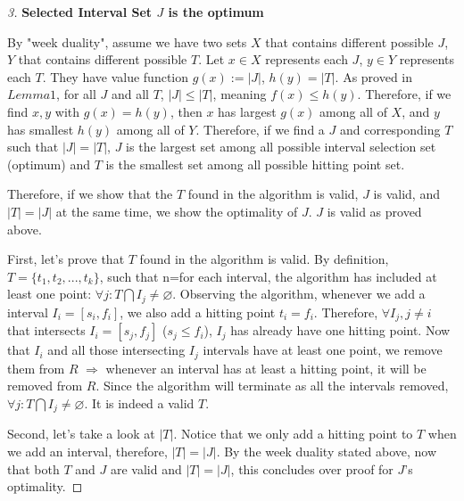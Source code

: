 \documentclass[openany]{article}
\begin{document}
\begin{proof}[3] \textbf{Selected Interval Set $J$ is the optimum}

    By "week duality", assume we have two sets $X$ that contains different possible $J$, $Y$ that contains different possible $T$. Let $x\in X$ represents each $J$, $y\in Y$ represents each $T$. They have value function $g(x):=|J|$, $h(y)=|T|$. As proved in $Lemma 1$, for all $J$ and all $T$, $|J| \leq |T|$, meaning $f(x) \leq h(y)$. Therefore, if we find $x, y$ with $g(x) = h(y)$, then $x$ has largest $g(x)$ among all of $X$, and $y$ has smallest $h(y)$ among all of $Y$. Therefore, if we find a $J$ and corresponding $T$ such that $|J| = |T|$, $J$ is the largest set among all possible interval selection set (optimum) and $T$ is the smallest set among all possible hitting point set.

    \qquad Therefore, if we show that the $T$ found in the algorithm is valid, $J$ is valid, and $|T|=|J|$ at the same time, we show the optimality of $J$. $J$ is valid as proved above.

    \qquad First, let's prove that $T$ found in the algorithm is valid. By definition, $T = \{t_1, t_2,...,t_k\}$, such that n=for each interval, the algorithm has included at least one point: $\forall j: T \bigcap I_j \neq \varnothing $. Observing the algorithm, whenever we add a interval $I_i=[s_i,f_i]$, we also add a hitting point $t_i = f_i$. Therefore, $\forall I_j, j\neq i$ that intersects $I_i=[s_j, f_j]$ ($s_j \leq f_i$), $I_j$ has already have one hitting point. Now that $I_i$ and all those intersecting $I_j$ intervals have at least one point, we remove them from $R$ $\Rightarrow$ whenever an interval has at least a hitting point, it will be removed from $R$. Since the algorithm will terminate as all the intervals removed, $\forall j:T \bigcap I_j \neq \varnothing$. It is indeed a valid $T$.

    \qquad Second, let's take a look at $|T|$. Notice that we only add a hitting point to $T$ when we add an interval, therefore, $|T| = |J|$. By the week duality stated above, now that both $T$ and $J$ are valid and $|T|=|J|$, this concludes over proof for $J$'s optimality.
    
\end{proof}
\end{document}
